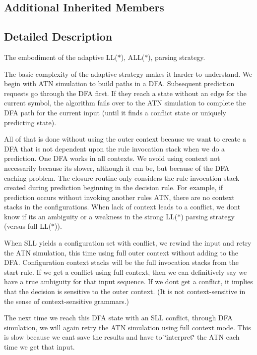 \subsection*{Additional Inherited Members}


\subsection{Detailed Description}
The embodiment of the adaptive L\+L($\ast$), A\+L\+L($\ast$), parsing strategy.

The basic complexity of the adaptive strategy makes it harder to understand. We begin with A\+TN simulation to build paths in a D\+FA. Subsequent prediction requests go through the D\+FA first. If they reach a state without an edge for the current symbol, the algorithm fails over to the A\+TN simulation to complete the D\+FA path for the current input (until it finds a conflict state or uniquely predicting state).

All of that is done without using the outer context because we want to create a D\+FA that is not dependent upon the rule invocation stack when we do a prediction. One D\+FA works in all contexts. We avoid using context not necessarily because it\textquotesingle{}s slower, although it can be, but because of the D\+FA caching problem. The closure routine only considers the rule invocation stack created during prediction beginning in the decision rule. For example, if prediction occurs without invoking another rule\textquotesingle{}s A\+TN, there are no context stacks in the configurations. When lack of context leads to a conflict, we don\textquotesingle{}t know if it\textquotesingle{}s an ambiguity or a weakness in the strong L\+L($\ast$) parsing strategy (versus full L\+L($\ast$)).

When S\+LL yields a configuration set with conflict, we rewind the input and retry the A\+TN simulation, this time using full outer context without adding to the D\+FA. Configuration context stacks will be the full invocation stacks from the start rule. If we get a conflict using full context, then we can definitively say we have a true ambiguity for that input sequence. If we don\textquotesingle{}t get a conflict, it implies that the decision is sensitive to the outer context. (It is not context-\/sensitive in the sense of context-\/sensitive grammars.)

The next time we reach this D\+FA state with an S\+LL conflict, through D\+FA simulation, we will again retry the A\+TN simulation using full context mode. This is slow because we can\textquotesingle{}t save the results and have to \char`\"{}interpret\char`\"{} the A\+TN each time we get that input.

